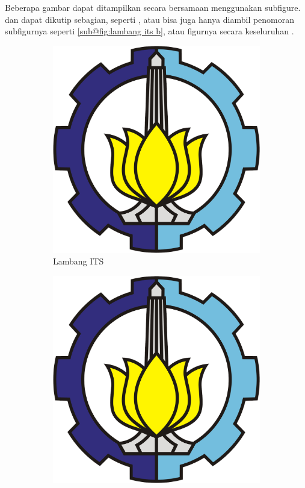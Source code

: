 {    Beberapa gambar dapat ditampilkan secara bersamaan menggunakan subfigure. dan dapat dikutip sebagian, seperti , atau bisa juga hanya diambil penomoran subfigurnya seperti \ref{sub@fig:lambang its b}, atau figurnya secara keseluruhan .
    \begin{figure}
        \centering
        \begin{subfigure}[b]{0.3\textwidth}
            \centering
            \includegraphics[width=\textwidth]{src/image/its-lambang.png}
            \caption{Lambang ITS}
            \label{fig:lambang its a}
        \end{subfigure}
        \begin{subfigure}[b]{0.3\textwidth}
            \centering
            \includegraphics[width=\textwidth]{src/image/its-lambang.png}

\end{subfigure}
\end{figure}}
